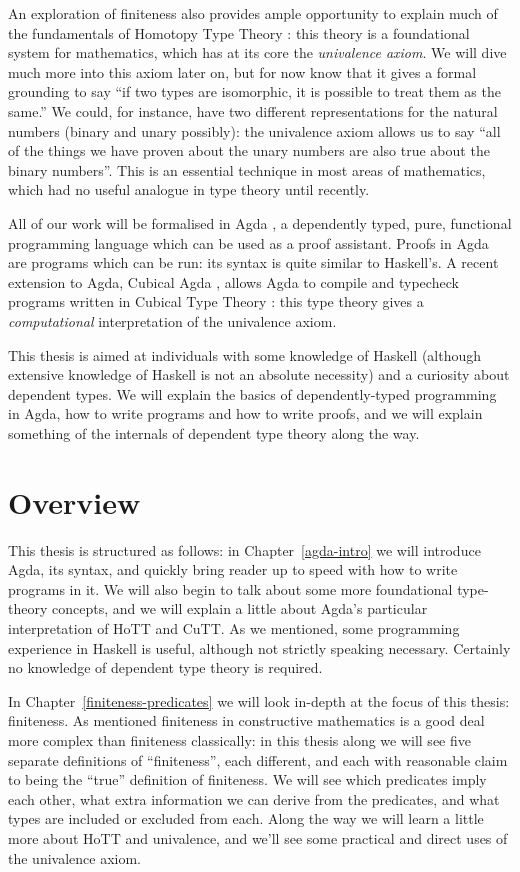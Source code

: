 An exploration of finiteness also provides ample opportunity to explain much of
the fundamentals of Homotopy Type Theory \citep{hottbook}: this theory is a
foundational system for mathematics, which has at its core the \emph{univalence
  axiom}.
We will dive much more into this axiom later on, but for now know that it gives
a formal grounding to say ``if two types are isomorphic, it is possible to treat
them as the same.''
We could, for instance, have two different representations for the natural
numbers (binary and unary possibly): the univalence axiom allows us to say ``all
of the things we have proven about the unary numbers are also true about the
binary numbers''.
This is an essential technique in most areas of mathematics, which
had no useful analogue in type theory until recently.

All of our work will be formalised in Agda
\citep{norellDependentlyTypedProgramming2008}, a
dependently typed, pure, functional programming language which can be
used as a proof assistant.
Proofs in Agda are programs which can be run: its syntax is quite similar to
Haskell's.
A recent extension to Agda, Cubical Agda
\citep{vezzosiCubicalAgdaDependently2019}, allows Agda to compile and typecheck
programs written in Cubical Type Theory \citep{cohenCubicalTypeTheory2016}: this
type theory gives a \emph{computational} interpretation of the univalence axiom.

This thesis is aimed at individuals with some knowledge of Haskell (although
extensive knowledge of Haskell is not an absolute necessity) and a curiosity
about dependent types.
We will explain the basics of dependently-typed programming in Agda, how to
write programs and how to write proofs, and we will explain something of the
internals of dependent type theory along the way.
\section{Overview}
This thesis is structured as follows: in Chapter~\ref{agda-intro} we will
introduce Agda, its syntax, and quickly bring reader up to speed with how to
write programs in it.
We will also begin to talk about some more foundational type-theory concepts,
and we will explain a little about Agda's particular interpretation of HoTT and
CuTT.
As we mentioned, some programming experience in Haskell is useful, although not
strictly speaking necessary.
Certainly no knowledge of dependent type theory is required.

In Chapter~\ref{finiteness-predicates} we will look in-depth at the focus of
this thesis: finiteness.
As mentioned finiteness in constructive mathematics is a good deal more complex
than finiteness classically:
in this thesis along we will see five separate definitions of ``finiteness'',
each different, and each with reasonable claim to being the ``true'' definition
of finiteness.
We will see which predicates imply each other, what extra information we can
derive from the predicates, and what types are included or excluded from each.
Along the way we will learn a little more about HoTT and univalence, and we'll
see some practical and direct uses of the univalence axiom.

